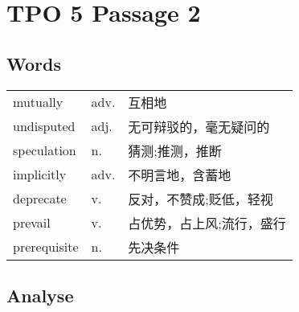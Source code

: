 \section{TPO 5 Passage 2}

\subsection{Words}

\begin{tabular}{lll}
    mutually     & adv. & 互相地           \\
    undisputed   & adj. & 无可辩驳的，毫无疑问的   \\
    speculation  & n.   & 猜测;推测，推断      \\
    implicitly   & adv. & 不明言地，含蓄地      \\
    deprecate    & v.   & 反对，不赞成;贬低，轻视  \\
    prevail      & v.   & 占优势，占上风;流行，盛行 \\
    prerequisite & n.   & 先决条件          \\
\end{tabular}

\subsection{Analyse}

